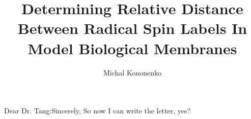 \documentclass{workreport}
\title{
    Determining Relative Distance Between Radical Spin Labels
    In Model Biological Membranes
}
\author{Michal Kononenko}
\begin{document}
\maketitlepage

\begin{letter_of_submittal}{Dear Dr. Tang:}{Sincerely,}
    So now I can write the letter, yes?
\end{letter_of_submittal}
\end{document}
